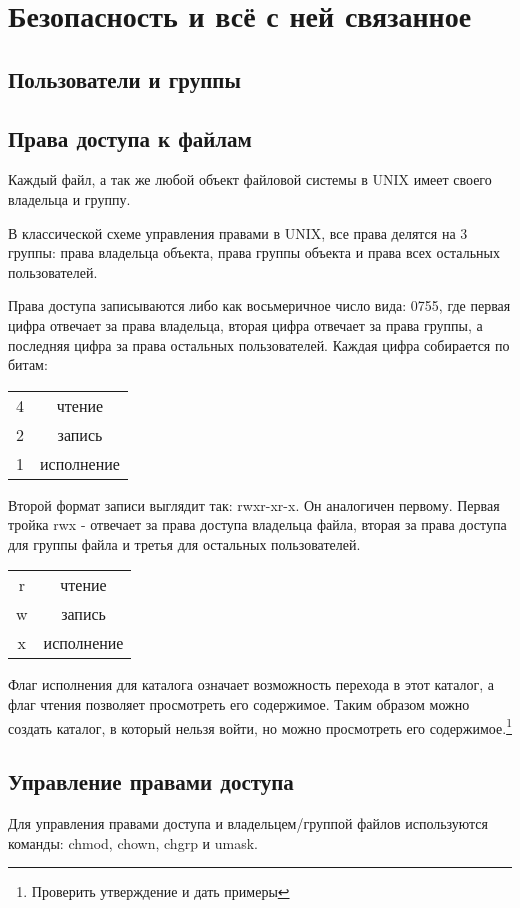 \chapter{Безопасность и всё с ней связанное}
\section{Пользователи и группы}
\section{Права доступа к файлам}
Каждый файл, а так же любой объект файловой системы в UNIX имеет своего владельца и группу.

В классической схеме управления правами в UNIX, все права делятся на 3 группы: права владельца объекта, права группы объекта и права  всех остальных пользователей.

Права доступа записываются либо как восьмеричное число вида: 0755, где первая цифра отвечает за права владельца, вторая цифра отвечает за права группы, а последняя цифра за права остальных пользователей. Каждая цифра собирается по битам:

\begin{tabular}{|c|c|}
4& чтение \\
2& запись \\
1& исполнение \\
\end{tabular}

Второй формат записи выглядит так: rwxr-xr-x. Он аналогичен первому. Первая тройка rwx - отвечает за права доступа владельца файла, вторая за права доступа для группы файла и третья для 
остальных пользователей.

\begin{tabular}{|c|c|}
r&чтение \\
w&запись \\
x&исполнение \\
\end{tabular}

Флаг исполнения для каталога означает возможность перехода в этот каталог, а флаг чтения позволяет просмотреть его содержимое. Таким образом можно создать каталог, в который нельзя войти, но можно просмотреть его содержимое.\footnote{Проверить утверждение и дать примеры}
\section{Управление правами доступа}
Для управления правами доступа и владельцем/группой файлов используются команды: chmod, chown, chgrp и umask.

